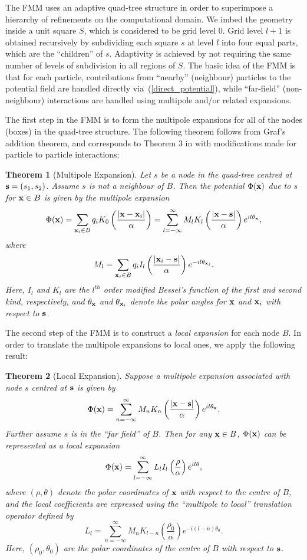 \documentclass[preprint,12pt]{elsarticle}
\newtheorem{theorem}{Theorem}[section]
\newcommand{\x}{{\bf x}}
\newcommand{\s}{{\bf s}}
\newcommand{\eqr}[1]{~(\ref{#1})}
\begin{document}
The FMM uses an adaptive quad-tree structure in order to superimpose a hierarchy of refinements on the computational domain.
We imbed the geometry inside a unit square $S$, which is considered to be grid level 0.
Grid level $l+1$ is obtained recursively by subdividing each square $s$ at level $l$ into four equal parts, which are the ``children'' of $s$. 
Adaptivity is achieved by not requiring the same number of levels of subdivision in all regions of $S$. 
The basic idea of the FMM is that for each particle, contributions from ``nearby'' (neighbour) particles to the potential field are handled directly via\eqr{direct_potential}, while ``far-field'' (non-neighbour) interactions are handled using multipole and/or related expansions. 

The first step in the FMM is to form the multipole expansions for all of the nodes (boxes) in the quad-tree structure. 
The following theorem follows from Graf's addition theorem, and corresponds to Theorem 3 in \cite{modified:helmholtz} with modifications made for particle to particle interactions:
\begin{theorem}[Multipole Expansion]
  Let $s$ be a node in the quad-tree centred at $\s=(s_1,s_2)$. 
  Assume $s$ is not a neighbour of $B$.
  Then the potential $\Phi(\x)$ due to $s$ for $\x \in B$ is given by the multipole expansion
  \[
     \Phi(\x) = \sum_{\x_{i} \in B} q_{i} K_{0}
  \left(\frac{|\x-\x_{i}|}{\alpha}\right)
   = \sum_{l=-\infty}^{\infty} M_l K_l \left( \frac{|\x-\s|}{\alpha}  \right) e^{i l \theta_\x},
  \]
  where
  \[
   M_{l} = \sum_{\x_{i} \in B} q_{i}
                I_{l}\left( \frac{|\x_{i} - \s|}{\alpha}
                             \right)e^{-i l \theta_{\x_{i}}}.
  \]
Here, $I_l$ and $K_l$ are the $l^{th}$ order modified Bessel's function of the first and second kind, respectively, and $\theta_\x$ and $\theta_{\x_{i}}$ denote the polar angles for $\x$ and $\x_i$ with respect to $\s$.
\end{theorem}

The second step of the FMM is to construct a  {\em local expansion} for each node $B$. In order to translate the multipole expansions to local ones, we apply the following result:
\begin{theorem}[Local Expansion]
 Suppose a multipole expansion associated with node $s$ centred at $\s$ is given by
  \[
     \Phi(\x) 
   = \sum_{n=-\infty}^{\infty} M_n K_n \left( \frac{|\x-\s|}{\alpha}  \right) e^{i l \theta_\x}.
  \]
 Further assume $s$ is in the ``far field'' of $B$.
 Then for any $\x \in B$, $\Phi(\x)$ can be represented as a local expansion
\[
   \Phi(\x) =  \sum_{l=-\infty}^{\infty} L_l I_l \left( \frac{\rho}{\alpha}  \right) e^{i l \theta},
\]
where $(\rho,\theta)$ denote the polar coordinates of $\x$ with respect to the centre of $B$, and the local coefficients are expressed using the ``multipole to local'' translation operator defined by 
  \[
  L_{l} = \sum_{n=-\infty}^\infty
                M_n K_{l-n}\left( \frac{\rho_0}{\alpha}
                             \right)e^{-i (l-n) \theta_0 }.
  \]
Here, $(\rho_0,\theta_0)$ are the polar coordinates of the centre of $B$ with respect to $\s$.
\end{theorem}
\end{document}
